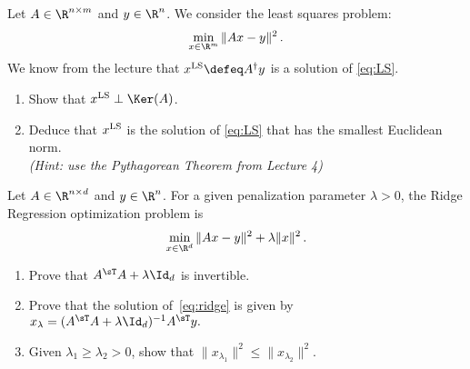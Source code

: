 \documentclass[11pt,nocut]{article}
\begin{document}



\vspace{5mm}

\begin{problem}[2 points]
	Let $A \in \R^{n \times m}$ and $y \in \R^n$. We consider the least squares problem:
	\begin{equation}\label{eq:LS}
		\min_{x \in \R^m} \|Ax - y\|^2\,.
	\end{equation}
	We know from the lecture that $x^{\rm LS} \defeq A^{\dagger}y$ is a solution of \eqref{eq:LS}. 
	\begin{enumerate}[label=\normalfont(\textbf{\alph*})]
		\item Show that $x^{\rm LS} \perp \Ker(A)$.
		\item Deduce that $x^{\rm LS}$ is the solution of \eqref{eq:LS} that has the smallest Euclidean norm. \\
  \textit{(Hint: use the Pythagorean Theorem from Lecture 4)}
	\end{enumerate}
\end{problem}

\vspace{5mm}

\begin{problem}[3 points]
	Let $A \in \R^{n \times d}$ and $y \in \R^n$.
	For a given penalization parameter $\lambda >0$, the Ridge Regression optimization problem is
	\begin{equation}\label{eq:ridge}
		\min_{x \in \R^d}
		\| Ax - y \|^2 + \lambda \|x\|^2 \,.
	\end{equation}
	\begin{enumerate}[label=\normalfont(\textbf{\alph*})]
		\item Prove that $A^{\sT} A + \lambda \Id_d$ is invertible. 
		\item Prove that the solution of~\eqref{eq:ridge} is given by
		$
		x_{\lambda} = (A^{\sT} A + \lambda \Id_d)^{-1} A^{\sT} y.
		$
            \item Given $\lambda_1\ge \lambda_2>0$, show that $\|x_{\lambda_1}\|^2 \le \|x_{\lambda_2}\|^2$. 
	\end{enumerate}
	
\end{problem}

\vspace{5mm}
\end{document}
